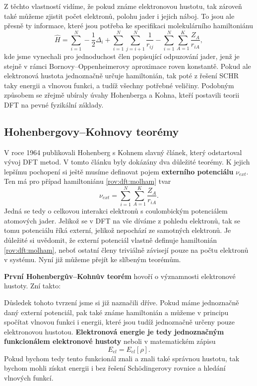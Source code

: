 Z těchto vlastností vidíme, že pokud známe elektronovou hustotu, tak zároveň také můžeme zjistit počet elektronů, polohu jader i jejich náboj. To jsou ale přesně ty informace, které jsou potřeba ke specifikaci molekulárního hamiltoniánu
\begin{equation}
\hat{H}=\sum_{i=1}^N -\frac{1}{2}\Delta_i+\sum_{i=1}^N\sum_{j=i+1}^N\frac{1}{r_{ij}}-\sum_{i=1}^N\sum_{A=1}^K \frac{Z_A}{r_{iA}} ,
\label{rov:dft:molham}
\end{equation}
kde jsme vynechali pro jednoduchost člen popisující odpuzování jader, jenž je stejně v rámci Bornovy--Oppenheimerovy aproximace roven konstantě. Pokud ale elektronová hustota jednoznačně určuje hamiltonián, tak poté z řešení SCHR taky energii a vlnovou funkci, a tudíž všechny potřebné veličiny. Podobným způsobem se zřejmě ubíraly úvahy Hohenberga a Kohna, kteří postavili teorii DFT na pevné fyzikální základy.

\subsection{Hohenbergovy--Kohnovy teorémy}

V roce 1964 publikovali Hohenberg s Kohnem slavný článek, který odstartoval vývoj DFT metod.
V tomto článku byly dokázány dva důležité teorémy. K jejich lepšímu pochopení si ještě musíme definovat pojem \textbf{externího potenciálu} $\nu_{ext}$. Ten má pro případ hamiltoniánu \eqref{rov:dft:molham} tvar
\begin{equation}
\nu_{ext} = \sum_{i=1}^N\sum_{A=1}^K \frac{Z_A}{r_{iA}} .
\end{equation} 
Jedná se tedy o celkovou interakci elektronů s coulombickým potenciálem atomových jader. Jelikož se v DFT na vše díváme z pohledu elektronů, tak se tomu potenciálu říká externí, jelikož nepochází ze samotných elektronů. Je důležité si uvědomit, že externí potenciál vlastně definuje hamiltonián \eqref{rov:dft:molham}, neboť ostatní členy triviálně závisejí pouze na počtu elektronů v systému. Nyní již můžeme přejít ke slíbeným teorémům.

\textbf{První Hohenbergův--Kohnův teorém} hovoří o významnosti elektronové hustoty. Zní takto:

\bigskip
\noindent {}

\bigskip
Důsledek tohoto tvrzení jsme si již naznačili dříve. Pokud máme jednoznačně daný externí potenciál, pak také známe hamiltonián a můžeme v principu spočítat vlnovou funkci i energii, které jsou tudíž jednoznačně určeny pouze elektronovou hustotou. \textbf{Elektronová energie je tedy jednoznačným funkcionálem elektronové hustoty} neboli v matematickém zápisu
\begin{equation}
E_{el}=E_{el}[\rho] .
\end{equation}
Pokud bychom tedy tento funkcionál znali a znali také správnou hustotu, tak bychom mohli získat energii i bez řešení Sch\"{o}dingerovy rovnice a hledání vlnových funkcí.

